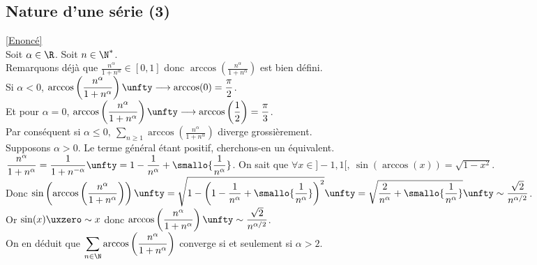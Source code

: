 \documentclass{book}
\begin{document}
	\subsection{Nature d'une série (3) }
	\label{Nature d'une série (3) corrigé}
	\textcolor{blue}{\hyperref[Nature d'une série (3)]{[Enoncé]}}\\
	Soit $\alpha\in \R$. Soit $n\in \N^*$.\\
	Remarquons déjà que $\displaystyle\frac{n^\alpha}{1+n^\alpha}\in [0,1]$ donc $\displaystyle\arccos\left(\frac{n^\alpha}{1+n^\alpha}\right)$ est bien défini.\\
	Si $\alpha<0$, $\displaystyle\arccos\left(\frac{n^\alpha}{1+n^\alpha}\right)\unfty\longrightarrow\arccos(0)=\frac{\pi}{2}$.\\
	Et pour $\alpha=0$, $\displaystyle\arccos\left(\frac{n^\alpha}{1+n^\alpha}\right)\unfty\longrightarrow\arccos\left(\frac{1}{2}\right)=\frac{\pi}{3}$.\\
	Par conséquent si $\alpha\leq 0,\ \displaystyle\sum_{n\geq 1}\arccos\left(\frac{n^\alpha}{1+n^\alpha}\right)$ diverge grossièrement.\\
	Supposons $\alpha>0$. Le terme général étant positif, cherchons-en un équivalent.\\
	$\displaystyle\frac{n^\alpha}{1+n^\alpha}=\frac{1}{1+n^{-\alpha}}\unfty=1-\frac{1}{n^\alpha}+\smallo{\frac{1}{n^\alpha}}$.
	On sait que $\forall x\in ]-1,1[,\ \sin(\arccos(x))=\sqrt{1-x^2}$.\\
	Donc $\displaystyle\sin\left(\arccos\left(\frac{n^\alpha}{1+n^\alpha}\right)\right)\unfty=\sqrt{1-\left(1-\frac{1}{n^\alpha}+\smallo{\frac{1}{n^\alpha}}\right)^2}\unfty=\sqrt{\frac{2}{n^\alpha}+\smallo{\frac{1}{n^\alpha}}}\unfty\sim\frac{\sqrt 2}{n^{\alpha/2}}$.\\
	Or $\sin(x)\uxzero\sim x$ donc $\displaystyle\arccos\left(\frac{n^\alpha}{1+n^\alpha}\right)\unfty\sim\frac{\sqrt 2}{n^{\alpha/2}}$.\\
	On en déduit que $\displaystyle\sum_{n\in \N}\arccos\left(\frac{n^\alpha}{1+n^\alpha}\right)$ converge si et seulement si $\alpha>2$.
	
\end{document}
